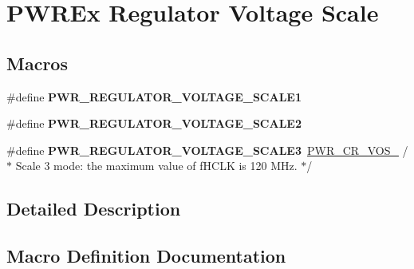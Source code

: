 \hypertarget{group___p_w_r_ex___regulator___voltage___scale}{}\section{P\+W\+R\+Ex Regulator Voltage Scale}
\label{group___p_w_r_ex___regulator___voltage___scale}
\subsection*{Macros}
\begin{DoxyCompactItemize}
\item 
\#define {\bfseries P\+W\+R\+\_\+\+R\+E\+G\+U\+L\+A\+T\+O\+R\+\_\+\+V\+O\+L\+T\+A\+G\+E\+\_\+\+S\+C\+A\+L\+E1}
\item 
\#define {\bfseries P\+W\+R\+\_\+\+R\+E\+G\+U\+L\+A\+T\+O\+R\+\_\+\+V\+O\+L\+T\+A\+G\+E\+\_\+\+S\+C\+A\+L\+E2}
\item 
\#define {\bfseries P\+W\+R\+\_\+\+R\+E\+G\+U\+L\+A\+T\+O\+R\+\_\+\+V\+O\+L\+T\+A\+G\+E\+\_\+\+S\+C\+A\+L\+E3}~\hyperlink{group___peripheral___registers___bits___definition_ga27b4e08a8936aa9828c5d683fde2fb59}{P\+W\+R\+\_\+\+C\+R\+\_\+\+V\+O\+S\+\_}           /$\ast$ Scale 3 mode\+: the maximum value of f\+H\+C\+LK is 120 M\+Hz. $\ast$/\hypertarget{group___p_w_r_ex___regulator___voltage___scale_gabed272232ad95f663da2a758834d0ba9}{}\label{group___p_w_r_ex___regulator___voltage___scale_gabed272232ad95f663da2a758834d0ba9}

\end{DoxyCompactItemize}


\subsection{Detailed Description}


\subsection{Macro Definition Documentation}
